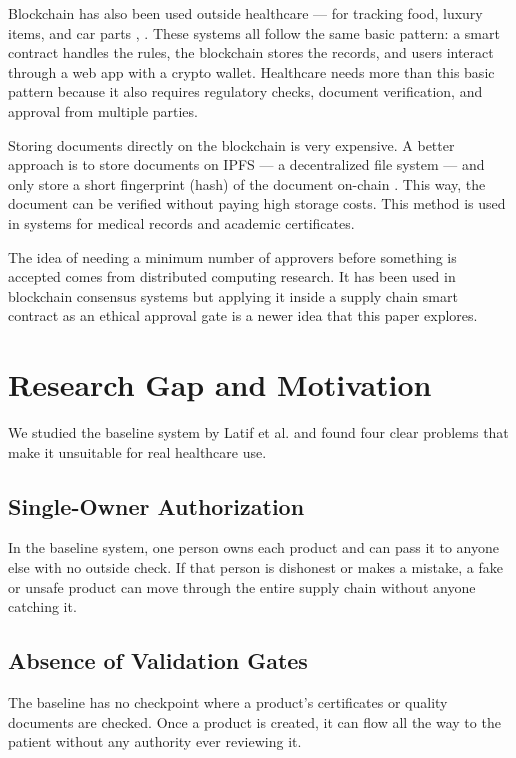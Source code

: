 \documentclass[conference]{IEEEtran}
\begin{document}
Blockchain has also been used outside healthcare --- for tracking food, luxury items, and car parts \cite{b2}, \cite{b3}. These systems all follow the same basic pattern: a smart contract handles the rules, the blockchain stores the records, and users interact through a web app with a crypto wallet. Healthcare needs more than this basic pattern because it also requires regulatory checks, document verification, and approval from multiple parties.

Storing documents directly on the blockchain is very expensive. A better approach is to store documents on IPFS --- a decentralized file system --- and only store a short fingerprint (hash) of the document on-chain \cite{b7}. This way, the document can be verified without paying high storage costs. This method is used in systems for medical records and academic certificates.

The idea of needing a minimum number of approvers before something is accepted comes from distributed computing research. It has been used in blockchain consensus systems but applying it inside a supply chain smart contract as an ethical approval gate is a newer idea that this paper explores.

\section{Research Gap and Motivation}

We studied the baseline system by Latif et al. and found four clear problems that make it unsuitable for real healthcare use.

\subsection{Single-Owner Authorization}

In the baseline system, one person owns each product and can pass it to anyone else with no outside check. If that person is dishonest or makes a mistake, a fake or unsafe product can move through the entire supply chain without anyone catching it.

\subsection{Absence of Validation Gates}

The baseline has no checkpoint where a product's certificates or quality documents are checked. Once a product is created, it can flow all the way to the patient without any authority ever reviewing it.
\end{document}
